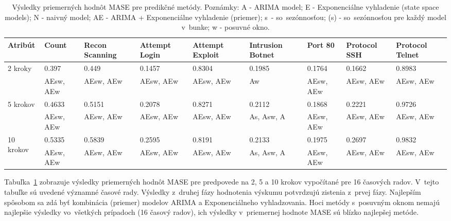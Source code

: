 \documentclass[thesismargins, thesislinespacing, openright, upjsfrontpage]{rnthesis}
\begin{document}
\begin{table}[h]
    \centering
    \footnotesize 
    \singlespacing 
    \begin{tabular}{|p{2cm}|p{1cm}|p{1.4cm}|p{1.2cm}|p{1.2cm}|p{1.4cm}|p{1cm}|p{1.2cm}|p{1.2cm}|} \hline
        Atribút & Count & Recon Scanning & Attempt Login & Attempt Exploit & Intrusion Botnet & Port 80 & Protocol SSH & Protocol Telnet  \\
        \hline\hline
        \multirow{2}{*}{2 kroky} & 0.397 & 0.449 & 0.1457 & 0.8304 & 0.1985 & 0.1764 & 0.1662 & 0.8983 \\
        & AEsw, AEw & AEsw, AEw & AEsw, AEw & AEsw, AEw & Aw & AEsw, AEw & AEsw, AEw & AEsw, AEw  \\
        \hline
        \multirow{2}{*}{5 krokov} & 0.4633 & 0.5151 & 0.2078 & 0.8271 & 0.2112 & 0.1868 & 0.2221 & 0.9726 \\
        & AEsw, AEw & AEsw, AEw & AEsw, AEw & AEsw, AEw & As, Asw, A & AEsw, AEw & AEsw, AEw & AEsw, AEw  \\
        \hline
        \multirow{2}{*}{10 krokov} & 0.5335 & 0.5839 & 0.2595 & 0.8191 & 0.2133 & 0.1975 & 0.2697 & 0.9832 \\
        & AEsw, AEw & AEsw, AEw & AEsw, AEw & AEsw, AEw & As, Asw, A & AEsw, AEw & AEsw, AEw & AEsw, AEw  \\
        \hline     
    \end{tabular}
    \caption{Výsledky priemerných hodnôt MASE pre predikčné metódy. Poznámky: A - ARIMA model; E - Exponenciálne vyhladenie (state space models); N - naivný model; AE - ARIMA + Exponenciálne vyhladenie (priemer); s~- so~sezónnosťou; (s) - so~sezónnosťou pre každý model v~bunke; w - posuvné okno.}
    \label{tab:mase_2nd_stage}
\end{table}

Tabuľka~\ref{tab:mase_2nd_stage} zobrazuje výsledky priemerných hodnôt MASE pre predpovede na 2, 5 a 10 krokov vypočítané pre 16 časových radov. V~tejto tabuľke sú uvedené významné časové rady. Výsledky z~druhej fázy hodnotenia výskumu potvrdzujú zistenia z~prvej fázy. Najlepším spôsobom sa zdá byť kombinácia (priemer) modelov ARIMA a Exponenciálneho vyhladzovania. Hoci metódy s~posuvným oknom nemajú najlepšie výsledky vo~všetkých prípadoch (16 časový radov), ich výsledky v~priemernej hodnote MASE sú blízko najlepšej metóde.
\end{document}
